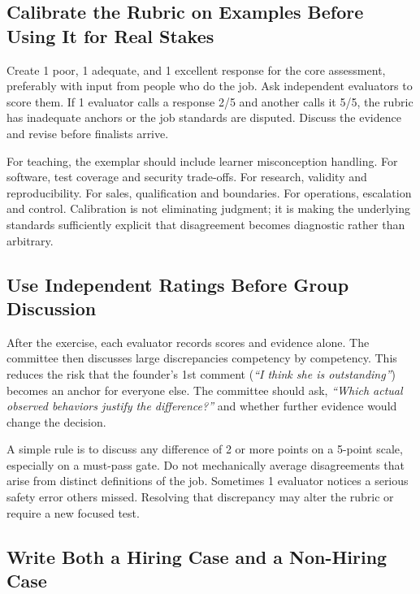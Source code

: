 \subsection{Calibrate the Rubric on Examples Before Using It for Real Stakes}
\label{sec:calibrate_rubric}

Create 1 poor, 1 adequate, and 1 excellent response for the core assessment, preferably with input from people who do the job. Ask independent evaluators to score them. If 1 evaluator calls a response 2/5 and another calls it 5/5, the rubric has inadequate anchors or the job standards are disputed. Discuss the evidence and revise before finalists arrive.

For teaching, the exemplar should include learner misconception handling. For software, test coverage and security trade-offs. For research, validity and reproducibility. For sales, qualification and boundaries. For operations, escalation and control. Calibration is not eliminating judgment; it is making the underlying standards sufficiently explicit that disagreement becomes diagnostic rather than arbitrary.

\subsection{Use Independent Ratings Before Group Discussion}
\label{sec:independent_ratings}

After the exercise, each evaluator records scores and evidence alone. The committee then discusses large discrepancies competency by competency. This reduces the risk that the founder's 1st comment (\textit{``I think she is outstanding''}) becomes an anchor for everyone else. The committee should ask, \textit{``Which actual observed behaviors justify the difference?''} and whether further evidence would change the decision.

A simple rule is to discuss any difference of 2 or more points on a 5-point scale, especially on a must-pass gate. Do not mechanically average disagreements that arise from distinct definitions of the job. Sometimes 1 evaluator notices a serious safety error others missed. Resolving that discrepancy may alter the rubric or require a new focused test.

\subsection{Write Both a Hiring Case and a Non-Hiring Case}
\label{sec:hiring_and_non_hiring_case}


